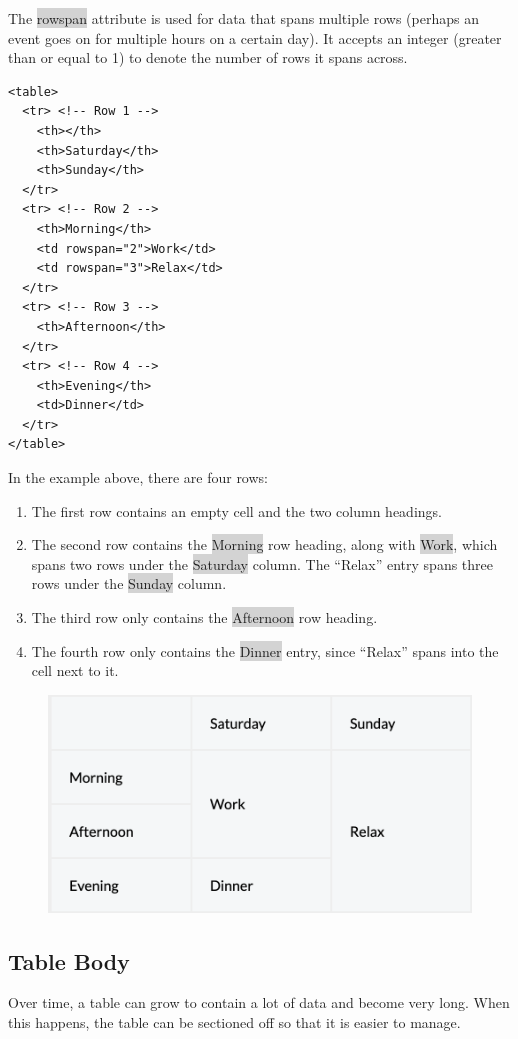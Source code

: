 \documentclass[11pt]{article}
\begin{document}
The \colorbox{lightgray}{rowspan} attribute is used for data that spans multiple rows (perhaps an event goes on for multiple hours on a certain day). It accepts an integer (greater than or equal to 1) to denote the number of rows it spans across.
\begin{lstlisting}
<table>
  <tr> <!-- Row 1 -->
    <th></th>
    <th>Saturday</th>
    <th>Sunday</th>
  </tr>
  <tr> <!-- Row 2 -->
    <th>Morning</th>
    <td rowspan="2">Work</td>
    <td rowspan="3">Relax</td>
  </tr>
  <tr> <!-- Row 3 -->
    <th>Afternoon</th>
  </tr>
  <tr> <!-- Row 4 -->
    <th>Evening</th>
    <td>Dinner</td>
  </tr>
</table>
\end{lstlisting}
In the example above, there are four rows:
\begin{enumerate}[leftmargin = *]
\item The first row contains an empty cell and the two column headings.
\item The second row contains the \colorbox{lightgray}{Morning} row heading, along with \colorbox{lightgray}{Work}, which spans two rows under the \colorbox{lightgray}{Saturday} column. The “Relax” entry spans three rows under the \colorbox{lightgray}{Sunday} column.
\item The third row only contains the \colorbox{lightgray}{Afternoon} row heading.
\item The fourth row only contains the \colorbox{lightgray}{Dinner} entry, since “Relax” spans into the cell next to it.
\end{enumerate}
\begin{figure}[H]
\includegraphics[scale = 0.7]{3_1}
\centering
\end{figure}

\subsection{Table Body}
Over time, a table can grow to contain a lot of data and become very long. When this happens, the table can be sectioned off so that it is easier to manage.
\end{document}
